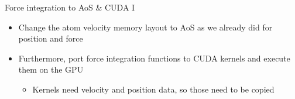 \documentclass[12pt,xcolor={rgb},t]{beamer}
\begin{document}
\begin{frame}[fragile]{Force integration to AoS \& CUDA I}

    \begin{itemize}
        \item Change the atom velocity memory layout to AoS as we already did for position and force
        \item Furthermore, port force integration functions to CUDA kernels and execute them on the GPU
        \begin{itemize}
            \item Kernels need velocity and position data, so those need to be copied
        \end{itemize}
    \end{itemize}

\end{frame}
\end{document}
